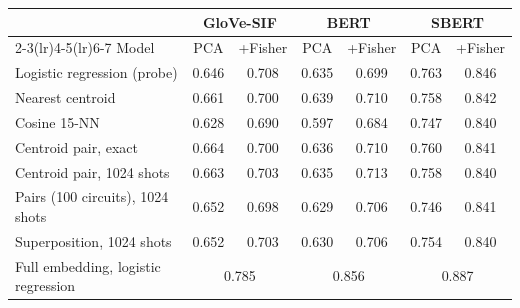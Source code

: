 \begin{tabular}{@{}lcccccc@{}}
\toprule
 & \multicolumn{2}{c}{GloVe-SIF} & \multicolumn{2}{c}{BERT} & \multicolumn{2}{c}{SBERT} \\
\cmidrule(lr){2-3}\cmidrule(lr){4-5}\cmidrule(lr){6-7}
Model & PCA & +Fisher & PCA & +Fisher & PCA & +Fisher \\
\midrule
Logistic regression (probe) & 0.646 & 0.708 & 0.635 & 0.699 & 0.763 & 0.846 \\
Nearest centroid & 0.661 & 0.700 & 0.639 & 0.710 & 0.758 & 0.842 \\
Cosine 15-NN & 0.628 & 0.690 & 0.597 & 0.684 & 0.747 & 0.840 \\
Centroid pair, exact & 0.664 & 0.700 & 0.636 & 0.710 & 0.760 & 0.841 \\
Centroid pair, 1024 shots & 0.663 & 0.703 & 0.635 & 0.713 & 0.758 & 0.840 \\
Pairs (100 circuits), 1024 shots & 0.652 & 0.698 & 0.629 & 0.706 & 0.746 & 0.841 \\
Superposition, 1024 shots & 0.652 & 0.703 & 0.630 & 0.706 & 0.754 & 0.840 \\
\midrule
Full embedding, logistic regression & \multicolumn{2}{c}{0.785} & \multicolumn{2}{c}{0.856} & \multicolumn{2}{c}{0.887} \\
\bottomrule
\end{tabular}